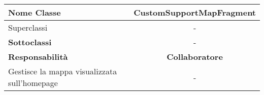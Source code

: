 
\setcounter{table}{0}
\begin{table}[H]
    \centering
    \begin{tabular}{||   l  ||  c   ||}
        \hline
        \rowcolor{Gray}
        \textbf{Nome Classe} & CustomSupportMapFragment\\
        \hline
        Superclassi  &  - \\
        \hline
        \textbf{Sottoclassi} & - \\
        \hline
         \textbf{Responsabilità} & \textbf{Collaboratore} \\
         \hline
          Gestisce la mappa visualizzata sull'homepage & - \\
         \hline
    \end{tabular}
\end{table}
